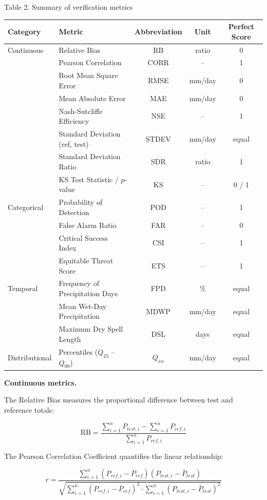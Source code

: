 \documentclass[11pt,a4paper]{article}
\begin{document}
Table 2. Summary of verification metrics

\begingroup\small
\begin{longtable}[]{@{}llccc@{}}
\toprule
Category & Metric & Abbreviation & Unit & Perfect Score \\
\midrule
\endhead
\bottomrule
\endlastfoot
Continuous & Relative Bias & RB & ratio & 0 \\
& Pearson Correlation & CORR & -- & 1 \\
& Root Mean Square Error & RMSE & mm/day & 0 \\
& Mean Absolute Error & MAE & mm/day & 0 \\
& Nash-Sutcliffe Efficiency & NSE & -- & 1 \\
& Standard Deviation (ref, test) & STDEV & mm/day & equal \\
& Standard Deviation Ratio & SDR & ratio & 1 \\
& KS Test Statistic / \(p\)-value & KS & -- & 0 / 1 \\
Categorical & Probability of Detection & POD & -- & 1 \\
& False Alarm Ratio & FAR & -- & 0 \\
& Critical Success Index & CSI & -- & 1 \\
& Equitable Threat Score & ETS & -- & 1 \\
Temporal & Frequency of Precipitation Days & FPD & \% & equal \\
& Mean Wet-Day Precipitation & MDWP & mm/day & equal \\
& Maximum Dry Spell Length & DSL & days & equal \\
Distributional & Percentiles (\(Q_{25}\) -- \(Q_{99}\)) & \(Q_{xx}\) &
mm/day & equal \\
\end{longtable}
\endgroup

\textbf{Continuous metrics.}

The Relative Bias measures the proportional difference between test and
reference totals:

\begin{equation}\text{RB} = \frac{\sum_{i=1}^{n} P_{test,i} - \sum_{i=1}^{n} P_{ref,i}}{\sum_{i=1}^{n} P_{ref,i}}\end{equation}

The Pearson Correlation Coefficient quantifies the linear relationship:

\begin{equation}r = \frac{\sum_{i=1}^{n}(P_{ref,i} - \bar{P}_{ref})(P_{test,i} - \bar{P}_{test})}{\sqrt{\sum_{i=1}^{n}(P_{ref,i} - \bar{P}_{ref})^2 \cdot \sum_{i=1}^{n}(P_{test,i} - \bar{P}_{test})^2}}\end{equation}
\end{document}
